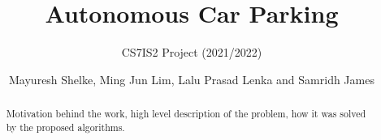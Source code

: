 \documentclass{svproc}
\begin{document}
\mainmatter
\title{Autonomous Car Parking
}
\subtitle{CS7IS2 Project (2021/2022)}
\author{Mayuresh Shelke, Ming Jun Lim, Lalu Prasad Lenka and Samridh James}


\maketitle              %

\begin{abstract}
Motivation behind the work, high level description of the problem, how it was solved by the proposed algorithms.
\end{abstract}
%


%


\end{document}
